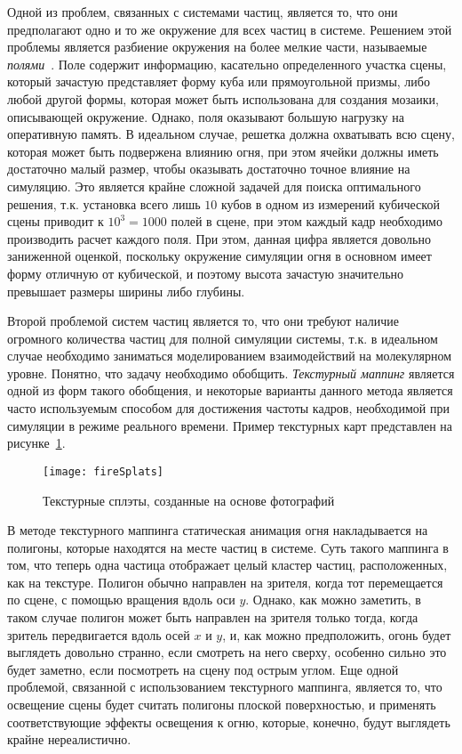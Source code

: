 Одной из проблем, связанных с системами частиц, является то, что они
предполагают одно и то же окружение для всех частиц в системе. Решением этой
проблемы является разбиение окружения на более мелкие части, называемые
\emph{полями}~\cite{nielsen}. Поле содержит информацию, касательно определенного
участка сцены, который зачастую представляет форму куба или прямоугольной
призмы, либо любой другой формы, которая может быть использована для создания
мозаики, описывающей окружение. Однако, поля оказывают большую нагрузку на
оперативную память. В идеальном случае, решетка должна охватывать всю сцену,
которая может быть подвержена влиянию огня, при этом ячейки должны иметь
достаточно малый размер, чтобы оказывать достаточно точное влияние на симуляцию.
Это является крайне сложной задачей для поиска оптимального решения, т\@.к\@.
установка всего лишь $10$ кубов в одном из измерений кубической сцены приводит к
$10^3 = 1000$ полей в сцене, при этом каждый кадр необходимо производить расчет
каждого поля. При этом, данная цифра является довольно заниженной оценкой,
поскольку окружение симуляции огня в основном имеет форму отличную от
кубической, и поэтому высота зачастую значительно превышает размеры ширины либо
глубины.

Второй проблемой систем частиц является то, что они требуют наличие огромного
количества частиц для полной симуляции системы, т\@.к\@. в идеальном случае
необходимо заниматься моделированием взаимодействий на молекулярном уровне.
Понятно, что задачу необходимо обобщить. \emph{Текстурный маппинг} является
одной из форм такого обобщения, и некоторые варианты данного метода является
часто используемым способом для достижения частоты кадров, необходимой при
симуляции в режиме реального времени. Пример текстурных карт представлен на
рисунке~\ref{fig:fireSplats}.
\begin{figure}[htb]
	\centering
    \texttt{[image: fireSplats]}
    \caption{Текстурные сплэты, созданные на основе
    фотографий~\cite{FireSplats}}%
    \label{fig:fireSplats}
\end{figure}
В методе текстурного маппинга статическая анимация огня накладывается на
полигоны, которые находятся на месте частиц в системе. Суть такого маппинга в
том, что теперь одна частица отображает целый кластер частиц, расположенных, как
на текстуре. Полигон обычно направлен на зрителя, когда тот перемещается по
сцене, с помощью вращения вдоль оси $y$. Однако, как можно заметить, в таком
случае полигон может быть направлен на зрителя только тогда, когда зритель
передвигается вдоль осей $x$ и $y$, и, как можно предположить, огонь будет
выглядеть довольно странно, если смотреть на него сверху, особенно сильно это
будет заметно, если посмотреть на сцену под острым углом. Еще одной проблемой,
связанной с использованием текстурного маппинга, является то, что освещение
сцены будет считать полигоны плоской поверхностью, и применять соответствующие
эффекты освещения к огню, которые, конечно, будут выглядеть крайне
нереалистично.

